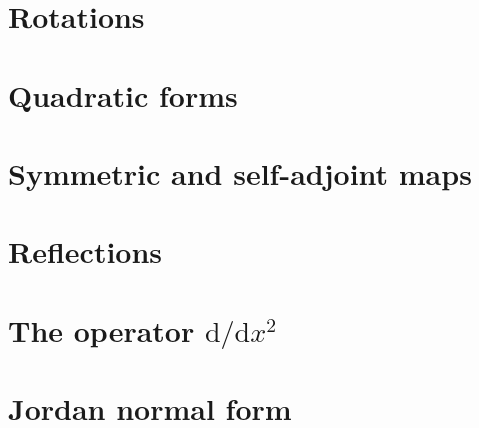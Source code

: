 \documentclass[letter-paper]{tufte-book}
\begin{document}

\section{Rotations}


\section{Quadratic forms}


\section{Symmetric and self-adjoint maps}


\section{Reflections}


\section{The operator $\mathrm{d}/\mathrm{d}x^2$}


\section{Jordan normal form}








\mainmatter




%


\end{document}
